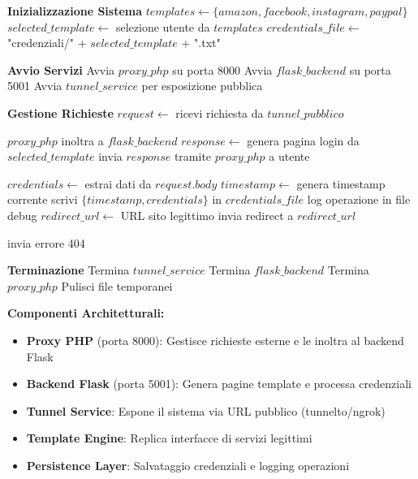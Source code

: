 \begin{algorithm}
\caption{Framework di Simulazione Phishing - JhonCecio}
\label{alg:jhoncecio}
\begin{algorithmic}[1]

\State \textbf{Inizializzazione Sistema}
\State $templates \gets \{amazon, facebook, instagram, paypal\}$
\State $selected\_template \gets$ selezione utente da $templates$
\State $credentials\_file \gets$ "credenziali/" + $selected\_template$ + ".txt"

\State
\State \textbf{Avvio Servizi}
\State Avvia $proxy\_php$ su porta 8000
\State Avvia $flask\_backend$ su porta 5001  
\State Avvia $tunnel\_service$ per esposizione pubblica

\State
\State \textbf{Gestione Richieste}
    \State $request \gets$ ricevi richiesta da $tunnel\_pubblico$
    
        \State $proxy\_php$ inoltra a $flask\_backend$
        \State $response \gets$ genera pagina login da $selected\_template$
        \State invia $response$ tramite $proxy\_php$ a utente
        
        \State $credentials \gets$ estrai dati da $request.body$
        \State $timestamp \gets$ genera timestamp corrente
        \State scrivi $\{timestamp, credentials\}$ in $credentials\_file$
        \State log operazione in file debug
        \State $redirect\_url \gets$ URL sito legittimo
        \State invia redirect a $redirect\_url$
        
    \Else
        \State invia errore 404
    \EndIf
\EndWhile

\State
\State \textbf{Terminazione}
\State Termina $tunnel\_service$
\State Termina $flask\_backend$ 
\State Termina $proxy\_php$
\State Pulisci file temporanei

\end{algorithmic}
\end{algorithm}

\vspace{0.5cm}

\textbf{Componenti Architetturali:}
\begin{itemize}
\item \textbf{Proxy PHP} (porta 8000): Gestisce richieste esterne e le inoltra al backend Flask
\item \textbf{Backend Flask} (porta 5001): Genera pagine template e processa credenziali
\item \textbf{Tunnel Service}: Espone il sistema via URL pubblico (tunnelto/ngrok)
\item \textbf{Template Engine}: Replica interfacce di servizi legittimi
\item \textbf{Persistence Layer}: Salvataggio credenziali e logging operazioni
\end{itemize}